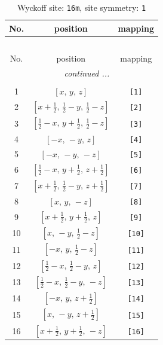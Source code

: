 \documentclass[fleqn,8pt]{jsarticle}
\begin{document}
\begin{longtable}{ccc}
\caption{Wyckoff site: {\tt 16m}, site symmetry: {\tt 1}}
 \\
 \hline \hline
No. & position & mapping \\ \hline \endfirsthead

\multicolumn{2}{l}{\tablename\ \thetable{}} \\
 \hline \hline
No. & position & mapping \\ \hline \endhead

 \hline \hline
\multicolumn{2}{r}{\footnotesize\it continued ...} \\ \endfoot

 \hline \hline
\multicolumn{2}{r}{} \\ \endlastfoot

1 & $\left[ x,\, y,\, z \right]$ & {\tt [1]} \\ \hline
2 & $\left[ x + \frac{1}{2},\, \frac{1}{2} - y,\, \frac{1}{2} - z \right]$ & {\tt [2]} \\ \hline
3 & $\left[ \frac{1}{2} - x,\, y + \frac{1}{2},\, \frac{1}{2} - z \right]$ & {\tt [3]} \\ \hline
4 & $\left[ - x,\, - y,\, z \right]$ & {\tt [4]} \\ \hline
5 & $\left[ - x,\, - y,\, - z \right]$ & {\tt [5]} \\ \hline
6 & $\left[ \frac{1}{2} - x,\, y + \frac{1}{2},\, z + \frac{1}{2} \right]$ & {\tt [6]} \\ \hline
7 & $\left[ x + \frac{1}{2},\, \frac{1}{2} - y,\, z + \frac{1}{2} \right]$ & {\tt [7]} \\ \hline
8 & $\left[ x,\, y,\, - z \right]$ & {\tt [8]} \\ \hline
9 & $\left[ x + \frac{1}{2},\, y + \frac{1}{2},\, z \right]$ & {\tt [9]} \\ \hline
10 & $\left[ x,\, - y,\, \frac{1}{2} - z \right]$ & {\tt [10]} \\ \hline
11 & $\left[ - x,\, y,\, \frac{1}{2} - z \right]$ & {\tt [11]} \\ \hline
12 & $\left[ \frac{1}{2} - x,\, \frac{1}{2} - y,\, z \right]$ & {\tt [12]} \\ \hline
13 & $\left[ \frac{1}{2} - x,\, \frac{1}{2} - y,\, - z \right]$ & {\tt [13]} \\ \hline
14 & $\left[ - x,\, y,\, z + \frac{1}{2} \right]$ & {\tt [14]} \\ \hline
15 & $\left[ x,\, - y,\, z + \frac{1}{2} \right]$ & {\tt [15]} \\ \hline
16 & $\left[ x + \frac{1}{2},\, y + \frac{1}{2},\, - z \right]$ & {\tt [16]} \\
\end{longtable}
\end{document}
